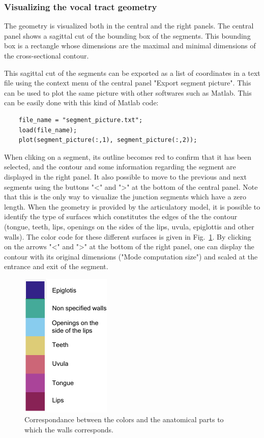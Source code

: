 \documentclass[]{article}
\begin{document}
	\subsubsection{Visualizing the vocal tract geometry}
	
	The geometry is visualized both in the central and the right panels.
	The central panel shows a sagittal cut of the bounding box of the 
	segments. This bounding box is a rectangle whose dimensions are 
	the maximal and minimal dimensions of the cross-sectional 
	contour.
	
	This sagittal cut of the segments can be exported as a list of 
	coordinates in a text file using the context menu of the central 
	panel "Export segment picture".
	This can be used to plot the same picture with other softwares such 
	as Matlab. This can be easily done with this kind of Matlab code:
	\begin{lstlisting}
	file_name = "segment_picture.txt";
	load(file_name);
	plot(segment_picture(:,1), segment_picture(:,2));
	\end{lstlisting}
	
	When cliking on a segment, its outline becomes red to confirm that
	it has been selected, and the contour and some information 
	regarding the segment are displayed in the right panel.
	It also possible to move to the previous and next segments using the buttons
	"<" and ">" at the bottom of the central panel.
	Note that this is the only way to visualize the junction segments which have 
	a zero length.
	When the geometry is provided by the articulatory model, it is 
	possible to identify the type of surfaces which constitutes the 
	edges of the the contour (tongue, teeth, lips, openings on the sides of the 
	lips, uvula, epiglottis and other walls).
	The color code for these different surfaces is given in 
	Fig.~\ref{figure:colormap_anatomical_parts}.
	By clicking on the arrows "<" and ">" at the bottom of the right  
	panel, one can display the contour with its original dimensions 
	("Mode computation size") and scaled at the entrance and exit of the
	segment.
	
	\begin{figure}[h!]
		\centering
		\includegraphics{colormap_anatomical_parts.pdf}
		\caption{Correspondance between the colors and the anatomical parts to which
		the walls corresponds.}
		\label{figure:colormap_anatomical_parts}
	\end{figure}
	
\end{document}

